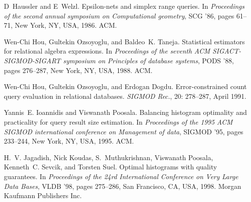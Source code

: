 \begin{thebibliography}{67}
D~Haussler and E~Welzl.
\newblock Epsilon-nets and simplex range queries.
\newblock In \emph{Proceedings of the second annual symposium on Computational
  geometry}, SCG '86, pages 61--71, New York, NY, USA, 1986. ACM.

Wen-Chi Hou, Gultekin Ozsoyoglu, and Baldeo~K. Taneja.
\newblock Statistical estimators for relational algebra expressions.
\newblock In \emph{Proceedings of the seventh ACM SIGACT-SIGMOD-SIGART
  symposium on Principles of database systems}, PODS '88, pages 276--287, New
  York, NY, USA, 1988. ACM.

Wen-Chi Hou, Gultekin Ozsoyoglu, and Erdogan Dogdu.
\newblock Error-constrained count query evaluation in relational databases.
\newblock \emph{SIGMOD Rec.}, 20: 278--287, April 1991.

Yannis~E. Ioannidis and Viswanath Poosala.
\newblock Balancing histogram optimality and practicality for query result size
  estimation.
\newblock In \emph{Proceedings of the 1995 ACM SIGMOD international conference
  on Management of data}, SIGMOD '95, pages 233--244, New York, NY, USA, 1995.
  ACM.

H.~V. Jagadish, Nick Koudas, S.~Muthukrishnan, Viswanath Poosala, Kenneth~C.
  Sevcik, and Torsten Suel.
\newblock Optimal histograms with quality guarantees.
\newblock In \emph{Proceedings of the 24rd International Conference on Very
  Large Data Bases}, VLDB '98, pages 275--286, San Francisco, CA, USA, 1998.
  Morgan Kaufmann Publishers Inc.


\end{thebibliography}
